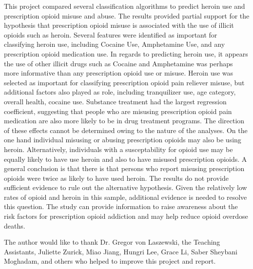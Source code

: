 \documentclass[sigconf]{acmart}
\begin{document}
This project compared several classification algorithms to predict heroin use 
and prescription opioid misuse and abuse. The results provided partial support
for the hypothesis that prescription opioid misuse is associated with the use
of illicit opioids such as heroin. Several features were identified as 
important for classifying heroin use, including Cocaine Use, Amphetamine Use, 
and any prescription opioid medication use. In regards to predicting heroin
use, it appears the use of other illicit drugs such as Cocaine and Amphetamine 
was perhaps more informative than any prescription opioid use or misuse. Heroin 
use was selected as important for classifying prescription opioid pain reliever 
misuse, but additional factors also played as role, including tranquilizer use,
age category, overall health, cocaine use. Substance treatment had the largest
regression coefficient, suggesting that people who are misusing prescription
opioid pain medication are also more likely to be in drug treatment programs. 
The direction of these effects cannot be determined owing to the nature of the 
analyses. On the one hand individual misusing or abusing prescription opioids 
may also be using heroin. Alternatively, individuals with a susceptability for 
opioid use may be equally likely to have use heroin and also to have misused 
prescription opioids. A general conclusion is that there is that persons who 
report misusing prescription opioids were twice as likely to have used heroin. 
The results do not provide sufficient evidence to rule out the alternative 
hypothesis. Given the relatively low rates of opioid and heroin in this sample, 
additional evidence is needed to resolve this question. The study can provide
information to raise awareness about the risk factors for prescription opioid 
addiction and may help reduce opioid overdose deaths. 


\begin{acks}

The author would like to thank Dr. Gregor von Laszewski, the Teaching 
Assistants, Juliette Zurick, Miao Jiang, Hungri Lee, Grace Li, Saber Sheybani
Moghadam, and others who helped to improve this project and report.

\end{acks}


 


\appendix
\end{document}
